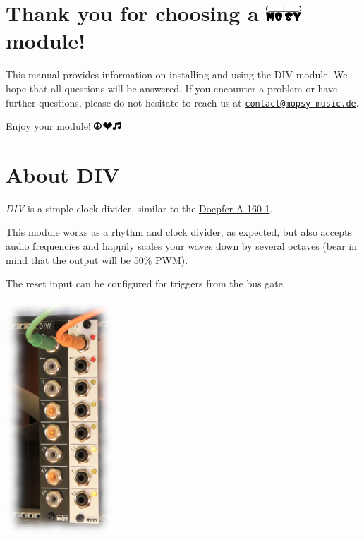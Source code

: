 \documentclass[a4paper,
               11pt,
               parskip=half,
               headinclude,
               titlepage=false]{scrartcl}
\begin{document}
\begin{minipage}[]{10.5cm}
\setlength{\parskip}{\medskipamount}
\section*{Thank you for choosing a \includegraphics[height=0.8em]{moPsy_logo} module!}

This manual provides information on installing and using the DIV module.
We hope that all questions will be answered.
If you encounter a problem or have further questions,
please do not hesitate to reach us at \href{mailto:contact@mopsy-music.de}{\texttt{contact@mopsy-music.de}}.


\vspace{1em}
\begin{center}
Enjoy your module! \quad \includegraphics[height=0.8em]{peace_love_music}
\end{center}

\section*{About DIV}
\emph{DIV} is a simple clock divider, similar to the \href{https://doepfer.de/a160.htm}{Doepfer A-160-1}.

This module works as a rhythm and clock divider, as expected, but also accepts audio frequencies and happily scales your waves down by several octaves (bear in mind that the output will be 50\% PWM).

The reset input can be configured for triggers from the bus gate.

\end{minipage}%
\hspace{0.5cm}
\begin{minipage}[]{4cm}
\includegraphics[width=4cm]{div-case-shot-frame}
\end{minipage}
\end{document}

